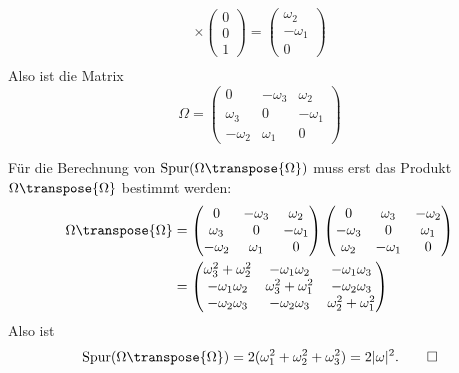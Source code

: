 \begin{loesung}
\begin{teilaufgaben}
\begin{align*}
\times
\begin{pmatrix}0\\0\\1\end{pmatrix}
=
\begin{pmatrix}\omega_2\\-\omega_1\\0\end{pmatrix}
\\
\end{align*}
Also ist die Matrix
\[
\Omega=\begin{pmatrix}
0&-\omega_3&\omega_2\\
\omega_3&0&-\omega_1\\
-\omega_2&\omega_1&0
\end{pmatrix}
\]
\item
Für die Berechnung von $\operatorname{Spur}(\Omega\transpose{\Omega})$ muss erst
das Produkt $\Omega\transpose{\Omega}$ bestimmt werden:
\begin{align*}
\Omega\transpose{\Omega}
&=
\begin{pmatrix}
0&-\omega_3&\omega_2\\
\omega_3&0&-\omega_1\\
-\omega_2&\omega_1&0
\end{pmatrix}
\begin{pmatrix}
0&\omega_3&-\omega_2\\
-\omega_3&0&\omega_1\\
\omega_2&-\omega_1&0
\end{pmatrix}
\\
&=
\begin{pmatrix}
\omega_3^2+\omega_2^2&-\omega_1\omega_2&-\omega_1\omega_3\\
-\omega_1\omega_2&\omega_3^2+\omega_1^2&-\omega_2\omega_3\\
-\omega_2\omega_3&-\omega_2\omega_3&\omega_2^2+\omega_1^2
\end{pmatrix}
\end{align*}
Also ist
\[
\operatorname{Spur}(\Omega\transpose{\Omega})
=
2(\omega_1^2+\omega_2^2+\omega_3^2)=2|\omega|^2.
\qedhere
\]
\end{teilaufgaben}
\end{loesung}

